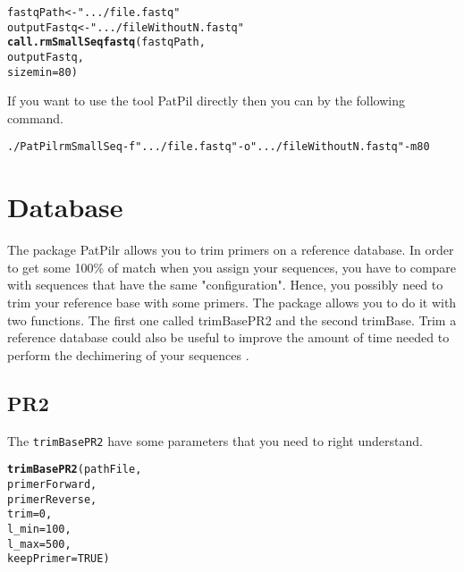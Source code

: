 \documentclass{article}\usepackage[]{graphicx}\usepackage[]{color}
\makeatletter
\newcommand{\hlnum}[1]{\textcolor[rgb]{0.686,0.059,0.569}{#1}}%
\newcommand{\hlstr}[1]{\textcolor[rgb]{0.192,0.494,0.8}{#1}}%
\newcommand{\hlstd}[1]{\textcolor[rgb]{0.345,0.345,0.345}{#1}}%
\newcommand{\hlkwb}[1]{\textcolor[rgb]{0.69,0.353,0.396}{#1}}%
\newcommand{\hlkwc}[1]{\textcolor[rgb]{0.333,0.667,0.333}{#1}}%
\newcommand{\hlkwd}[1]{\textcolor[rgb]{0.737,0.353,0.396}{\textbf{#1}}}%
\newenvironment{kframe}{%
 \def\at@end@of@kframe{}%
 \ifinner\ifhmode%
  \def\at@end@of@kframe{\end{minipage}}%
  \begin{minipage}{\columnwidth}%
 \fi\fi%
 \def\FrameCommand##1{\hskip\@totalleftmargin \hskip-\fboxsep
 \colorbox{shadecolor}{##1}\hskip-\fboxsep
     \hskip-\linewidth \hskip-\@totalleftmargin \hskip\columnwidth}%
 \MakeFramed {\advance\hsize-\width
   \@totalleftmargin\z@ \linewidth\hsize
   \@setminipage}}%
 {\par\unskip\endMakeFramed%
 \at@end@of@kframe}
\newenvironment{knitrout}{}{} %
\makeatother
\begin{document}
\begin{knitrout}
\color{fgcolor}\begin{kframe}
\begin{alltt}
\hlstd{fastqPath} \hlkwb{<-} \hlstr{".../file.fastq"}
\hlstd{outputFastq} \hlkwb{<-} \hlstr{".../fileWithoutN.fastq"}
\hlkwd{call.rmSmallSeqfastq}\hlstd{(fastqPath,}
        \hlstd{outputFastq,}
        \hlkwc{sizemin} \hlstd{=} \hlnum{80}\hlstd{)}
\end{alltt}
\end{kframe}
\end{knitrout}
If you want to use the tool PatPil directly then you can by the following command.
\begin{knitrout}
\color{fgcolor}\begin{kframe}
\begin{alltt}
./PatPil rmSmallSeq -f \hlstr{".../file.fastq"} -o \hlstr{".../fileWithoutN.fastq"} -m 80
\end{alltt}
\end{kframe}
\end{knitrout}

\newpage
\section{Database}
The package PatPilr allows you to trim primers on a reference database. In order to get some 100\% of match when you assign your sequences, you have to compare with sequences that have the same "configuration". Hence, you possibly need to trim your reference base with some primers. The package allows you to do it with two functions. The first one called trimBasePR2 \cite{doi:10.1093/nar/gks1160} and the second trimBase. Trim a reference database could also be useful to improve the amount of time needed to perform the dechimering of your sequences \cite{Edgar074252}.


\subsection{PR2}

The \texttt{trimBasePR2} have some parameters that you need to right understand.
\begin{knitrout}
\color{fgcolor}\begin{kframe}
\begin{alltt}
\hlkwd{trimBasePR2}\hlstd{(pathFile,}
        \hlstd{primerForward,}
        \hlstd{primerReverse,}
        \hlkwc{trim} \hlstd{=} \hlnum{0}\hlstd{,}
        \hlkwc{l_min} \hlstd{=} \hlnum{100}\hlstd{,}
        \hlkwc{l_max} \hlstd{=} \hlnum{500}\hlstd{,}
        \hlkwc{keepPrimer} \hlstd{=} \hlnum{TRUE}\hlstd{)}
\end{alltt}
\end{kframe}
\end{knitrout}
\end{document}
